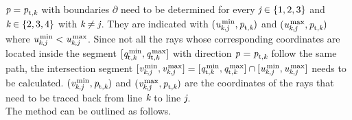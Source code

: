 $\textit{p}= \textit{p}_{\textrm{t,} \textit{\textit{k}}}$ with boundaries $\partial$ need to be determined for every $\textit{j} \in \{1,2,3\}$ and $\textit{k} \in \{2,3,4\}$ with $\textit{k}\neq\textit{j}$. 
They are indicated with  $(\textit{u}_{\textit{k},\textit{j}}^\textrm{\,min}, \textit{p}_{\textrm{t,} \textit{\textit{k}}})$ and $(\textit{u}_{\textit{k},\textit{j}}^\textrm{\,max}, \textit{p}_{\textrm{t,} \textit{\textit{k}}})$ where 
$\textit{u}_{\textit{k},\textit{j}}^\textrm{\,min}<\textit{u}_{\textit{k},\textit{j}}^\textrm{\,max}$. 
Since not all the rays whose corresponding coordinates are located inside the segment
$[\textit{q}_{\textrm{t,} \textit{\textit{k}}}^\textrm{\,min}, \textit{q}_{\textrm{t,} \textit{\textit{k}}}^\textrm{\,max}]$ with direction $ \textit{p}_{\textrm{} \textit{}} =\textit{p}_{\textrm{t,} \textit{\textit{k}}}$ follow the same path, the intersection segment 
$[\textit{v}_{\textit{k},\textit{j}}^\textrm{\,min}, \textit{v}_{\textit{k},\textit{j}}^\textrm{\,max}] = [\textit{q}_{\textrm{t,} \textit{\textit{k}}}^\textrm{\,min}, \textit{q}_{\textrm{t,} \textit{\textit{k}}}^\textrm{\,max}] \cap [\textit{u}_{\textit{k},\textit{j}}^\textrm{\,min}, \textit{u}_{\textit{k},\textit{j}}^\textrm{\,max}]$ needs to be calculated. $(\textit{v}_{\textit{k},\textit{j}}^\textrm{\,min},\textit{p}_{\textrm{t,} \textit{\textit{k}}})$ and $(\textit{v}_{\textit{k},\textit{j}}^\textrm{\,max},\textit{p}_{\textrm{t,} \textit{\textit{k}}})$ are the coordinates of the rays that need to be traced back from line $\textit{k}$ to line $\textit{j}$.
\\ \indent The method can be outlined as follows.
